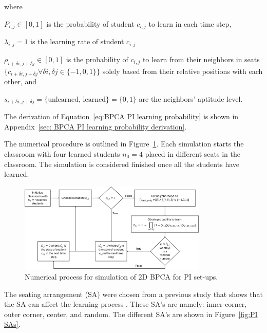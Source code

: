where

$P_{i,j} \in [0,1]$ is the probability of student $c_{i,j}$ to learn in each time step, 

$\lambda_{i,j} = 1$ is the learning rate of student $c_{i,j}$

$\rho_{i+\delta i, j+\delta j} \in [0,1]$ is the probability of $c_{i,j}$ to learn from their neighbors in seats $\lbrace c_{i+\delta i, j+\delta j} \forall \delta i, \delta j \in \lbrace -1,0,1 \rbrace \rbrace$ solely based from their relative positions with each other, and

$s_{i+\delta i, j+\delta j} = \lbrace\text{unlearned, learned}\rbrace=\lbrace 0,1 \rbrace$ are the neighbors' aptitude level.

The derivation of Equation~\ref{eq:BPCA PI learning probability} is shown in Appendix~\ref{sec: BPCA PI learning probability derivation}.

The numerical procedure is outlined in Figure~\ref{fig:2DBPCA PI Flowchart}. 
Each simulation starts the classroom with four learned students $n_0 = 4$ placed in different seats in the classroom. 
The simulation is considered finished once all the students have learned.

\begin{figure}[htbp!]
    \centering
    \includegraphics[width=0.8\textwidth]{figures/2DBPCA PI Flowchart.png}
    \caption[Peer instruction flowchart]{Numerical process for simulation of 2D BPCA for PI set-ups.}
    \label{fig:2DBPCA PI Flowchart}
\end{figure}

The seating arrangement (SA) were chosen from a previous study that shows that the SA can affect the learning process \cite{roxas2010seating}. 
These SA's are namely: inner corner, outer corner, center, and random. The different SA's are shown in Figure~\ref{fig:PI SAs}.


